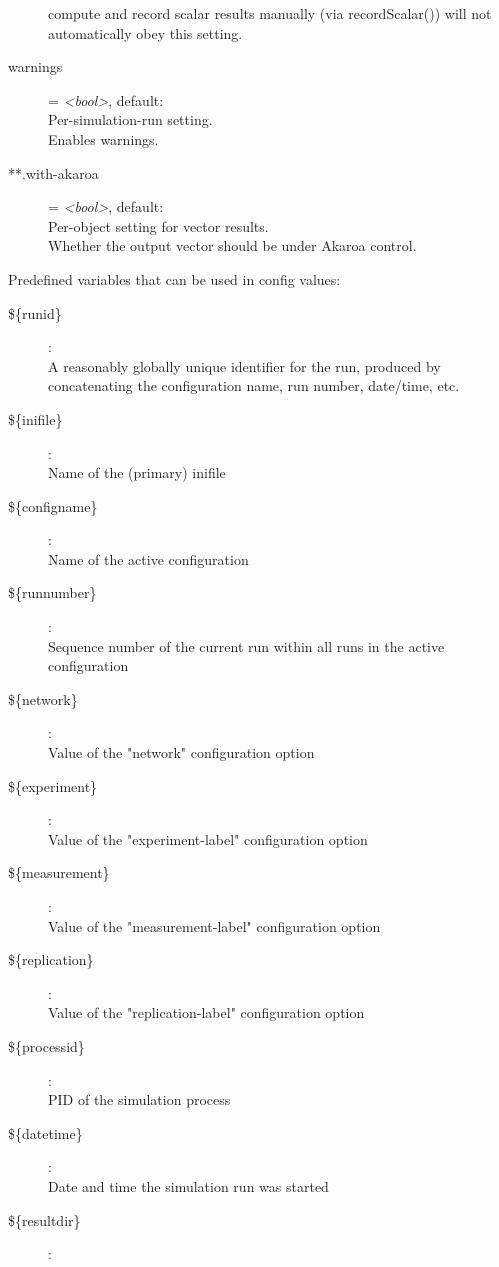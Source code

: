 \begin{description}
    compute and record scalar results manually (via recordScalar()) will not
    automatically obey this setting.
\item[warnings] = \textit{<bool>}, default: \\
    Per-simulation-run setting.\\
    Enables warnings.
\item[**.with-akaroa] = \textit{<bool>}, default: \\
    Per-object setting for vector results.\\
    Whether the output vector should be under Akaroa control.
\end{description}

Predefined variables that can be used in config values:

\begin{description}
\item[\$\{runid\}] : \\
    A reasonably globally unique identifier for the run, produced by
    concatenating the configuration name, run number, date/time, etc.
\item[\$\{inifile\}] : \\
    Name of the (primary) inifile
\item[\$\{configname\}] : \\
    Name of the active configuration
\item[\$\{runnumber\}] : \\
    Sequence number of the current run within all runs in the active
    configuration
\item[\$\{network\}] : \\
    Value of the "network" configuration option
\item[\$\{experiment\}] : \\
    Value of the "experiment-label" configuration option
\item[\$\{measurement\}] : \\
    Value of the "measurement-label" configuration option
\item[\$\{replication\}] : \\
    Value of the "replication-label" configuration option
\item[\$\{processid\}] : \\
    PID of the simulation process
\item[\$\{datetime\}] : \\
    Date and time the simulation run was started
\item[\$\{resultdir\}] : \\

\end{description}
